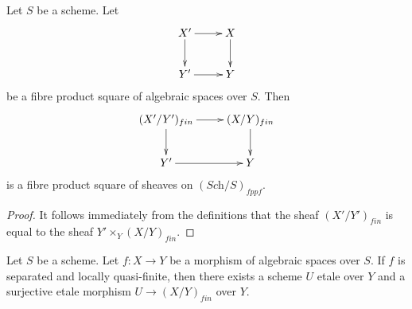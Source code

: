 \begin{lemma}
\label{lemma-finite-pullback}
Let $S$ be a scheme.
Let
$$
\xymatrix{
X' \ar[d] \ar[r] & X \ar[d] \\
Y' \ar[r] & Y
}
$$
be a fibre product square of algebraic spaces over $S$. Then
$$
\xymatrix{
(X'/Y')_{fin} \ar[d] \ar[r] & (X/Y)_{fin} \ar[d] \\
Y' \ar[r] & Y
}
$$
is a fibre product square of sheaves on $(\textit{Sch}/S)_{fppf}$.
\end{lemma}

\begin{proof}
It follows immediately from the definitions that
the sheaf $(X'/Y')_{fin}$ is equal to the sheaf
$Y' \times_Y (X/Y)_{fin}$.
\end{proof}

\begin{lemma}
\label{lemma-finite-surjective-etale-cover}
Let $S$ be a scheme.
Let $f : X \to Y$ be a morphism of algebraic spaces over $S$.
If $f$ is separated and locally quasi-finite, then there exists a
scheme $U$ etale over $Y$ and a surjective etale morphism
$U \to (X/Y)_{fin}$ over $Y$.
\end{lemma}

